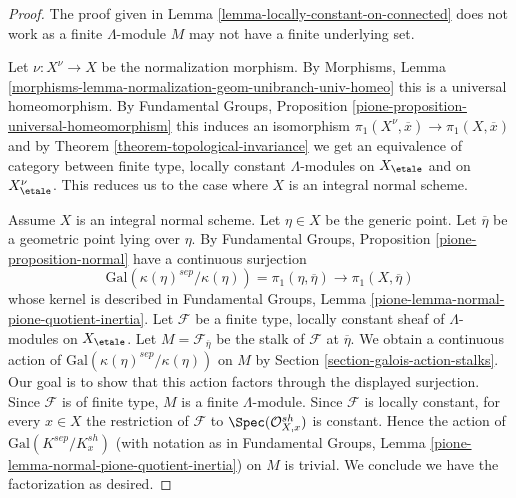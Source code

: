 \begin{proof}
The proof given in Lemma \ref{lemma-locally-constant-on-connected}
does not work as a finite $\Lambda$-module $M$ may not have a finite
underlying set.

\medskip\noindent
Let $\nu : X^\nu \to X$ be the normalization morphism. By Morphisms, Lemma
\ref{morphisms-lemma-normalization-geom-unibranch-univ-homeo}
this is a universal homeomorphism. By
Fundamental Groups, Proposition \ref{pione-proposition-universal-homeomorphism}
this induces an isomorphism
$\pi_1(X^\nu, \overline{x}) \to \pi_1(X, \overline{x})$
and by Theorem \ref{theorem-topological-invariance} we get
an equivalence of category between finite type, locally constant
$\Lambda$-modules on $X_\etale$ and on $X^\nu_\etale$.
This reduces us to the case where $X$ is an integral normal scheme.

\medskip\noindent
Assume $X$ is an integral normal scheme. Let $\eta \in X$ be the generic point.
Let $\overline{\eta}$ be a geometric point lying over $\eta$.
By Fundamental Groups, Proposition \ref{pione-proposition-normal}
have a continuous surjection
$$
\text{Gal}(\kappa(\eta)^{sep}/\kappa(\eta)) = \pi_1(\eta, \overline{\eta})
\longrightarrow
\pi_1(X, \overline{\eta})
$$
whose kernel is described in Fundamental Groups, Lemma
\ref{pione-lemma-normal-pione-quotient-inertia}.
Let $\mathcal{F}$ be a finite type, locally constant sheaf of $\Lambda$-modules
on $X_\etale$. Let $M = \mathcal{F}_{\overline{\eta}}$
be the stalk of $\mathcal{F}$ at $\overline{\eta}$.
We obtain a continuous action of $\text{Gal}(\kappa(\eta)^{sep}/\kappa(\eta))$
on $M$ by Section \ref{section-galois-action-stalks}.
Our goal is to show that this action factors through the
displayed surjection.
Since $\mathcal{F}$ is of finite type, $M$ is a finite $\Lambda$-module.
Since $\mathcal{F}$ is locally constant, for every $x \in X$
the restriction of $\mathcal{F}$ to $\Spec(\mathcal{O}_{X, x}^{sh})$
is constant. Hence the action of $\text{Gal}(K^{sep}/K_x^{sh})$
(with notation as in Fundamental Groups, Lemma
\ref{pione-lemma-normal-pione-quotient-inertia})
on $M$ is trivial. We conclude we have the factorization as desired.


\end{proof}
